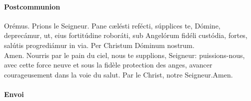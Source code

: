 \documentclass[twoside]{article}
\begin{document}
\paragraph{Postcommunion}
\begin{paracol}{2}
\vv Orémus.
\switchcolumn
\vv Prions le Seigneur.
\switchcolumn*
Pane cælésti refécti,
súpplices te, Dómine, deprecámur,
ut, eius fortitúdine roboráti,
sub Angelórum fidéli custódia,
fortes, salútis progrediámur in via.
Per Christum Dóminum nostrum.\\
\rr Amen.
\switchcolumn
Nourris par le pain du ciel,
nous te supplions, Seigneur:
puissions-nous, avec cette force neuve
et sous la fidèle protection des anges,
avancer courageusement dans la voie du salut.
Par le Christ, notre Seigneur.\capsaut\rr Amen.
\end{paracol}

\paragraph{Envoi}

\end{document}
